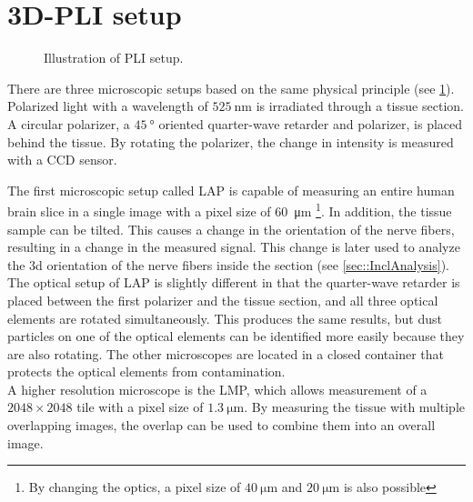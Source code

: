 \section{3D-PLI setup}\label{sec:expSetup}
%
\begin{figure}[!t]
    \captionsetup[sub]{position=top}
    \setlength{\tikzwidth}{\textwidth}
	\centering
	\caption{Illustration of PLI setup.}
	\label{fig:pli_setup}
\end{figure}
%
There are three microscopic setups based on the same physical principle \cite{Axer2011} (see \cref{fig:pli_setup}).
Polarized light with a wavelength of $\SI{525}{\nano\meter}$ is irradiated through a tissue section.
A circular polarizer, a $\SI{45}{\degree}$ oriented quarter-wave retarder and polarizer, is placed behind the tissue.
By rotating the polarizer, the change in intensity is measured with a \ac{CCD} sensor.
\par
%
The first microscopic setup called \ac{LAP} is capable of measuring an entire human brain slice in a single image with a pixel size of \SI{60}{\micro\meter} \footnote{By changing the optics, a pixel size of $\SI{40}{\micro\meter}$ and $\SI{20}{\micro\meter}$ is also possible}.
In addition, the tissue sample can be tilted.
This causes a change in the orientation of the nerve fibers, resulting in a change in the measured signal.
This change is later used to analyze the 3d orientation of the nerve fibers inside the section (see \cref{sec::InclAnalysis}).
The optical setup of \ac{LAP} is slightly different in that the quarter-wave retarder is placed between the first polarizer and the tissue section, and all three optical elements are rotated simultaneously.
This produces the same results, but dust particles on one of the optical elements can be identified more easily because they are also rotating.
The other microscopes are located in a closed container that protects the optical elements from contamination.
\\
% 
A higher resolution microscope is the \ac{LMP}, which allows measurement of a $\num{2048}\times\num{2048}$ tile with a pixel size of $\SI{1.3}{\micro\meter}$.
By measuring the tissue with multiple overlapping images, the overlap can be used to combine them into an overall image.
